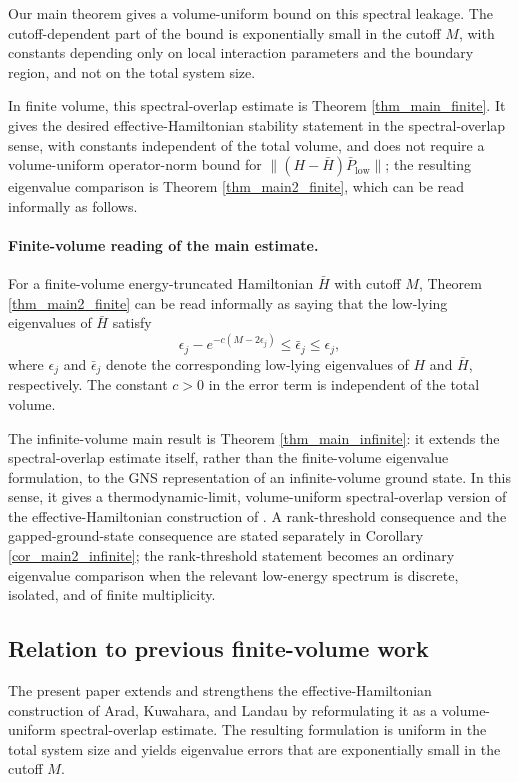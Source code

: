 \documentclass[11pt]{article}
\numberwithin{equation}{section}
\begin{document}
Our main theorem gives a volume-uniform bound on this spectral leakage. The cutoff-dependent part of the bound is exponentially small in the cutoff $M$, with constants depending only on local interaction parameters and the boundary region, and not on the total system size.

In finite volume, this spectral-overlap estimate is Theorem \ref{thm_main_finite}. It gives the desired effective-Hamiltonian stability statement in the spectral-overlap sense, with constants independent of the total volume, and does not require a volume-uniform operator-norm bound for $\|(H-\bar{H})\bar{P}_{\mathrm{low}}\|$; the resulting eigenvalue comparison is Theorem \ref{thm_main2_finite}, which can be read informally as follows.

\paragraph{Finite-volume reading of the main estimate.}
For a finite-volume energy-truncated Hamiltonian $\bar{H}$ with cutoff $M$, Theorem \ref{thm_main2_finite} can be read informally as saying that the low-lying eigenvalues of $\bar{H}$ satisfy
\[
\epsilon_j-e^{-c(M-2\epsilon_j)}\leq \bar\epsilon_j\leq\epsilon_j,
\]
where $\epsilon_j$ and $\bar{\epsilon}_j$ denote the corresponding low-lying eigenvalues of $H$ and $\bar{H}$, respectively. The constant $c>0$ in the error term is independent of the total volume.
\bigskip

The infinite-volume main result is Theorem \ref{thm_main_infinite}: it extends the spectral-overlap estimate itself, rather than the finite-volume eigenvalue formulation, to the GNS representation of an infinite-volume ground state. In this sense, it gives a thermodynamic-limit, volume-uniform spectral-overlap version of the effective-Hamiltonian construction of \cite{Arad-Kuwahara-Landau 2016}. A rank-threshold consequence and the gapped-ground-state consequence are stated separately in Corollary \ref{cor_main2_infinite}; the rank-threshold statement becomes an ordinary eigenvalue comparison when the relevant low-energy spectrum is discrete, isolated, and of finite multiplicity.

\subsection{Relation to previous finite-volume work}
The present paper extends and strengthens the effective-Hamiltonian construction of Arad, Kuwahara, and Landau \cite{Arad-Kuwahara-Landau 2016} by reformulating it as a volume-uniform spectral-overlap estimate. The resulting formulation is uniform in the total system size and yields eigenvalue errors that are exponentially small in the cutoff $M$.
\end{document}
